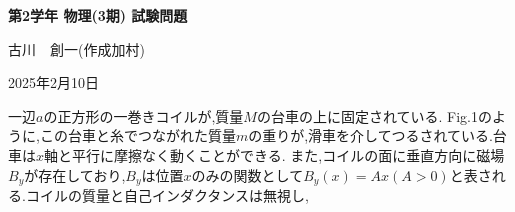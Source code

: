 \documentclass[b4paper,landscape,twocolumn,10pt,fleqn]{jsarticle}
\begin{document}
\vspace{5cm}
\centerline{\Large\textbf{第2学年 物理(3期) 試験問題}}
\vspace{0.5cm}
\centerline{古川　創一(作成加村)}
\vspace{0.3cm}
\centerline{\Large{2025年2月10日}}
\vspace{0.3cm}

一辺$a$の正方形の一巻きコイルが,質量$M$の台車の上に固定されている.
Fig.1のように,この台車と糸でつながれた質量$m$の重りが,滑車を介してつるされている.台車は$x$軸と平行に摩擦なく動くことができる.
また,コイルの面に垂直方向に磁場$B_y$が存在しており,$B_y$は位置$x$のみの関数として$B_y(x)=Ax(A>0)$と表される.コイルの質量と自己インダクタンスは無視し,
\end{document}
